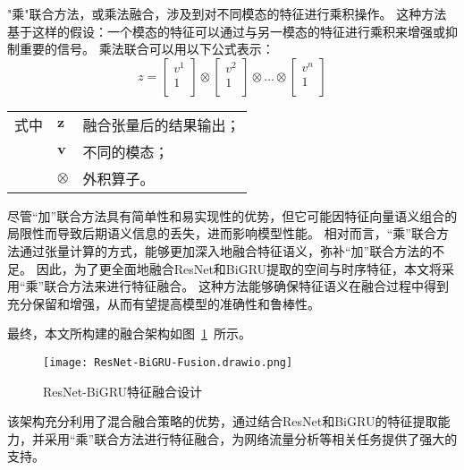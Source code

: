   "乘"联合方法，或乘法融合，涉及到对不同模态的特征进行乘积操作。
  这种方法基于这样的假设：一个模态的特征可以通过与另一模态的特征进行乘积来增强或抑制重要的信号。
  乘法联合可以用以下公式表示：
\begin{equation}
  z = \begin{bmatrix}v^1 \\1\\\end{bmatrix} \otimes \begin{bmatrix}v^2 \\1\\\end{bmatrix} \otimes \dots \otimes \begin{bmatrix}v^n \\1\\\end{bmatrix}
\end{equation}  
\begin{flushleft}
  \renewcommand\arraystretch{1.25}
  \begin{tabularx}{\textwidth}{@{}>{\normalsize\rm}l@{\quad}>{\normalsize\rm}l@{——}>{\normalsize\rm}X@{}}
  式中& $\symbf{z}$ &融合张量后的结果输出；\\
  &  $\symbf{v}$&不同的模态；\\
  &  $\symbf{\otimes}$ &外积算子。\\
   \end{tabularx}\vspace{.5ex}%
\end{flushleft}



尽管“加”联合方法具有简单性和易实现性的优势，但它可能因特征向量语义组合的局限性而导致后期语义信息的丢失，进而影响模型性能。
相对而言，“乘”联合方法通过张量计算的方式，能够更加深入地融合特征语义，弥补“加”联合方法的不足\cite{hejunandzhangcaiqing}。
因此，为了更全面地融合ResNet和BiGRU提取的空间与时序特征，本文将采用“乘”联合方法来进行特征融合。
这种方法能够确保特征语义在融合过程中得到充分保留和增强，从而有望提高模型的准确性和鲁棒性。\par

最终，本文所构建的融合架构如图~\ref{fig:ResNet-BiGRU-Fusion}~所示。
\begin{figure}[htbp]
  \centering
  \texttt{[image: ResNet-BiGRU-Fusion.drawio.png]}
  \caption{ResNet-BiGRU特征融合设计}
  \label{fig:ResNet-BiGRU-Fusion}
\end{figure}
该架构充分利用了混合融合策略的优势，通过结合ResNet和BiGRU的特征提取能力，并采用“乘”联合方法进行特征融合，为网络流量分析等相关任务提供了强大的支持。

